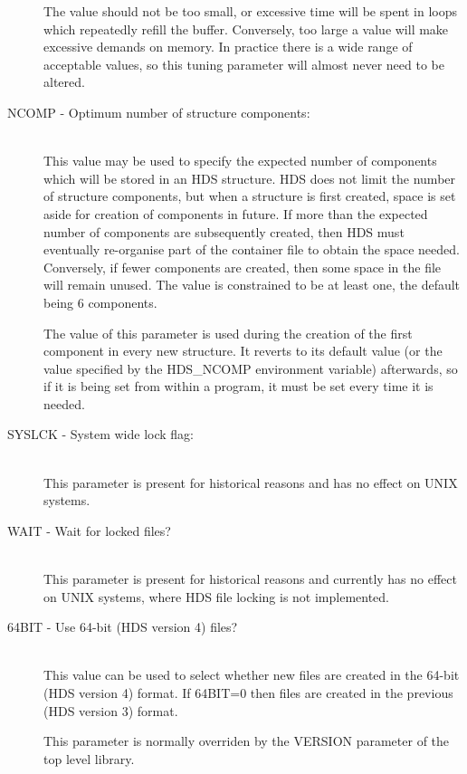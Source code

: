 \documentclass[twoside,11pt]{starlink}
\begin{document}
\begin{description}
The value should not be too small, or excessive time will be spent in
loops which repeatedly refill the buffer. Conversely, too large a
value will make excessive demands on memory. In practice there is a
wide range of acceptable values, so this tuning parameter will almost
never need to be altered.

\item [\xlabel{HDS_NCOMP_tuning_parameter}NCOMP - Optimum number of structure components:]\mbox{}\\
This value may be used to specify the expected number of components
which will be stored in an HDS structure. HDS does not limit the
number of structure components, but when a structure is first created,
space is set aside for creation of components in future. If more than
the expected number of components are subsequently created, then HDS
must eventually re-organise part of the container file to obtain the
space needed. Conversely, if fewer components are created, then some
space in the file will remain unused. The value is constrained to be
at least one, the default being 6 components.

The value of this parameter is used during the creation of the first
component in every new structure.  It reverts to its default value (or
the value specified by the HDS\_NCOMP environment variable)
afterwards, so if it is being set from within a program, it must be
set every time it is needed.

\item [\xlabel{HDS_SYSLCK_tuning_parameter}SYSLCK - System wide lock flag:]\mbox{}\\
This parameter is present for historical reasons and has no effect on
UNIX systems.

\item [\xlabel{HDS_WAIT_tuning_parameter}WAIT - Wait for locked files?]\mbox{}\\
This parameter is present for historical reasons and currently has no
effect on UNIX systems, where HDS file locking is not implemented.

\item [\xlabel{HDS_64BIT_tuning_parameter}64BIT - Use 64-bit (HDS version 4) files?]\mbox{}\\
This value can be used to select whether new files are created
in the 64-bit (HDS version 4) format.  If 64BIT=0 then
files are created in the previous (HDS version 3) format.

This parameter is normally overriden by the VERSION parameter
of the top level library.

\end{description}
\end{document}

